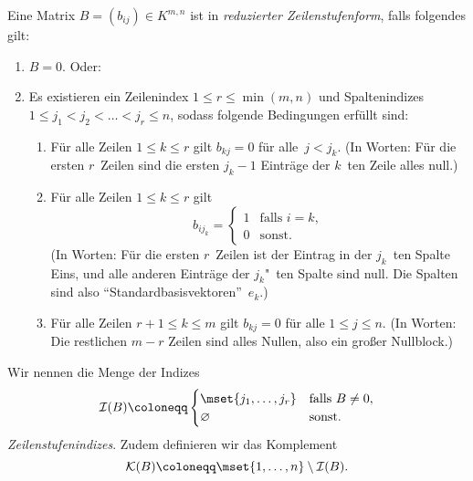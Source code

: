 \documentclass[a4paper]{article}
\begin{document}
\begin{definition}
    Eine Matrix $B = (b_{ij}) \in K^{m,n}$ ist in \emph{reduzierter Zeilenstufenform}, falls folgendes gilt:
    \begin{enumerate}
        \item $B = 0$. Oder:
        \item Es existieren ein Zeilenindex $1 \leq r \leq \min(m,n)$ und Spaltenindizes $1 \leq j_1 < j_2 < \dots < j_r \leq n$, sodass folgende Bedingungen erfüllt sind:
              \begin{enumerate}
                  \item Für alle Zeilen $1 \leq k \leq r$ gilt $b_{kj} = 0$ für alle~$j < j_k$. (In Worten: Für die ersten $r$~Zeilen sind die ersten $j_k-1$ Einträge der $k$~ten Zeile alles null.)
                  \item Für alle Zeilen $1 \leq k \leq r$ gilt
                        \begin{equation*}
                            b_{ij_k} = \begin{cases}
                                1 & \text{falls } i = k, \\
                                0 & \text{sonst}.
                            \end{cases}
                        \end{equation*}
                        (In Worten: Für die ersten $r$~Zeilen ist der Eintrag in der $j_k$~ten Spalte Eins, und alle anderen Einträge der $j_k$"~ten Spalte sind null. Die Spalten sind also "`Standardbasisvektoren"'~$e_k$.)
                  \item Für alle Zeilen $r+1 \leq k \leq m$ gilt $b_{kj} = 0$ für alle $1 \leq j \leq n$. (In Worten: Die restlichen $m-r$ Zeilen sind alles Nullen, also ein großer Nullblock.)
              \end{enumerate}
    \end{enumerate}
\end{definition}

\begin{notation}[Zeilenstufenindizes]
    Wir nennen die Menge der Indizes
    \begin{equation*}
        \mathcal{I}(B) \coloneqq \begin{cases}
            \mset{j_1,\dots,j_r} & \text{falls } B \neq 0, \\
            \varnothing          & \text{sonst}.
        \end{cases}
    \end{equation*}
    \emph{Zeilenstufenindizes}. Zudem definieren wir das Komplement
    \begin{equation*}
        \mathcal{K}(B) \coloneqq \mset{1,\dots,n} \setminus \mathcal{I}(B).
    \end{equation*}
\end{notation}
\end{document}
